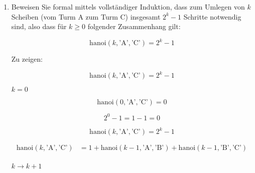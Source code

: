\documentclass{bschlangaul-aufgabe}
\begin{document}
\begin{enumerate}


\item Beweisen Sie formal mittels vollständiger Induktion, dass zum
Umlegen von $k$ Scheiben (\zB vom Turm A zum Turm C) insgesamt
$2^k-1$ Schritte notwendig sind, also dass für $k \geq 0$ folgender
Zusammenhang gilt:

\begin{displaymath}
\text{hanoi}(k,\text{'A'},\text{'C'}) = 2^k - 1
\end{displaymath}

\begin{bAntwort}
Zu zeigen:

\begin{displaymath}
\text{hanoi}(k,\text{'A'},\text{'C'}) = 2^k - 1
\end{displaymath}

%

\bInduktionAnfang

$k=0$

\begin{displaymath}
\text{hanoi}(0,\text{'A'},\text{'C'}) = 0
\end{displaymath}

\begin{displaymath}
2^0 - 1 = 1 - 1 = 0
\end{displaymath}

%

\bInduktionVoraussetzung

\begin{displaymath}
\text{hanoi}(k,\text{'A'},\text{'C'}) = 2^k - 1
\end{displaymath}

%

\bInduktionSchritt

\begin{align*}
\text{hanoi}(k, \text{'A'},\text{'C'})
& = 1 +
    \text{hanoi}(k - 1, \text{'A'},\text{'B'}) +
    \text{hanoi}(k - 1, \text{'B'},\text{'C'})\\
\end{align*}

$k \rightarrow k + 1$


\end{bAntwort}
\end{enumerate}
\end{document}
